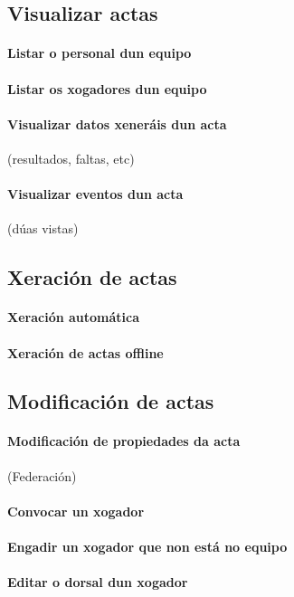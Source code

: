 \documentclass[a4paper,spanish,10p,titlepage]{report}
\begin{document}
  \subsection{Visualizar actas}
    \paragraph{Listar o personal dun equipo}
    \paragraph{Listar os xogadores dun equipo}
    \paragraph{Visualizar datos xeneráis dun acta} (resultados, faltas, etc)
    \paragraph{Visualizar eventos dun acta} (dúas vistas)

  \subsection{Xeración de actas}
    \paragraph{Xeración automática}
    \paragraph{Xeración de actas offline}

  \subsection{Modificación de actas}
    \paragraph{Modificación de propiedades da acta} (Federación)
    \paragraph{Convocar un xogador}
    \paragraph{Engadir un xogador que non está no equipo}
    \paragraph{Editar o dorsal dun xogador}
\end{document}
